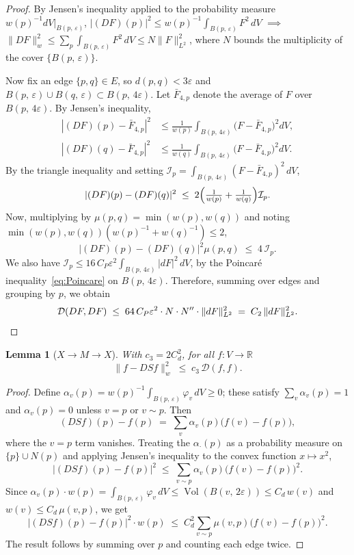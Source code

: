 \documentclass[10pt,reqno]{amsart}
\newtheorem{lemma}[theorem]{Lemma}
\theoremstyle{remark}
\newcommand{\R}{\mathbb{R}}
\newcommand{\Vol}{\operatorname{Vol}}
\newcommand{\normw}[1]{\lVert #1 \rVert_{w}}
\newcommand{\norml}[1]{\lVert #1 \rVert_{L^{2}}}
\newcommand{\DD}{\mathcal{D}}
\newcommand{\B}[2]{B(#1,\,#2)}
\begin{document}
\begin{proof}
By Jensen's inequality applied to the probability measure
$w(p)^{-1}dV|_{\B{p}{\varepsilon}}$,
$|(DF)(p)|^2\leq w(p)^{-1}\int_{\B{p}{\varepsilon}}F^2\,dV$
$\implies$
$\normw{DF}^2\leq\sum_p\int_{\B{p}{\varepsilon}}F^2\,dV\leq N\norml{F}^2$,
where $N$ bounds the multiplicity of the cover $\{\B{p}{\varepsilon}\}$.

Now fix an edge $\{p,q\}\in E$, so $d(p,q)<3\varepsilon$ and
$\B{p}{\varepsilon}\cup\B{q}{\varepsilon}\subset\B{p}{4\varepsilon}$.
Let $\bar{F}_{4,p}$ denote the average of $F$ over $\B{p}{4\varepsilon}$.
By Jensen's inequality, 
\begin{align*}
  |(DF)(p)-\bar{F}_{4,p}|^2
  &\leq
  \frac{1}{w(p)}\int_{\B{p}{4\varepsilon}}\!\bigl(F-\bar{F}_{4,p}\bigr)^2 dV,\\
  |(DF)(q)-\bar{F}_{4,p}|^2
  &\leq
  \frac{1}{w(q)}\int_{\B{p}{4\varepsilon}}\!\bigl(F-\bar{F}_{4,p}\bigr)^2 dV.
\end{align*}
By the triangle inequality and setting
$\mathcal{I}_p=\int_{\B{p}{4\varepsilon}}(F-\bar{F}_{4,p})^2\,dV$,
\[
  |(DF)(p)-(DF)(q)|^2
  \;\leq\;
  2\Bigl(\tfrac{1}{w(p)}+\tfrac{1}{w(q)}\Bigr)\mathcal{I}_p.
\]
Now, multiplying by $\mu(p,q)=\min(w(p),w(q))$ and noting
$\min(w(p),w(q))(w(p)^{-1}+w(q)^{-1})\leq 2$,
\[
  |(DF)(p)-(DF)(q)|^2\mu(p,q)
  \;\leq\;
  4\,\mathcal{I}_p.
\]
We also have $\mathcal{I}_p\leq 16\,C_P\varepsilon^2\int_{\B{p}{4\varepsilon}}|dF|^2\,dV$, by the Poincar\'e inequality~\eqref{eq:Poincare} on $\B{p}{4\varepsilon}$. 
Therefore, summing over edges and grouping by $p$, we obtain
\[
  \DD(DF,DF)
  \;\leq\;
  64\,C_P\varepsilon^2\cdot N\cdot N''\cdot\norml{dF}^2
  \;=\;
  C_2\,\norml{dF}^2.
  \qedhere
\]
\end{proof}



\begin{lemma}[$X\to M\to X$]
\label{lem:compXMX}
With $c_3 = 2C_d^2$, for all $f:V\to\R$
\[
  \normw{f-DSf}^2 \;\leq\; c_3\,\DD(f,f).
\]
\end{lemma}

\begin{proof}
Define $\alpha_v(p)=w(p)^{-1}\int_{\B{p}{\varepsilon}}\varphi_v\,dV\geq 0$;
these satisfy $\sum_v\alpha_v(p)=1$ and $\alpha_v(p)=0$ unless $v=p$ or
$v\sim p$. Then
\[
  (DSf)(p)-f(p)
  \;=\;
  \sum_v\alpha_v(p)\bigl(f(v)-f(p)\bigr),
\]
where the $v=p$ term vanishes. Treating the
$\alpha_\cdot(p)$ as a probability measure on $\{p\}\cup N(p)$ and
applying Jensen's inequality to the convex function $x\mapsto x^2$,
\[
  |(DSf)(p)-f(p)|^2
  \;\leq\;
  \sum_{v\sim p}\alpha_v(p)\bigl(f(v)-f(p)\bigr)^2.
\]
Since
$\alpha_v(p)\cdot w(p)
 =\int_{\B{p}{\varepsilon}}\varphi_v\,dV
 \leq\Vol(\B{v}{2\varepsilon})
 \leq C_d\,w(v)$
and $w(v)\leq C_d\,\mu(v,p)$, we get
\[
  |(DSf)(p)-f(p)|^2\cdot w(p)
  \;\leq\;
  C_d^2\sum_{v\sim p}\mu(v,p)\bigl(f(v)-f(p)\bigr)^2.
\]
The result follows by summing over $p$ and counting each edge twice.
\end{proof}
\end{document}

